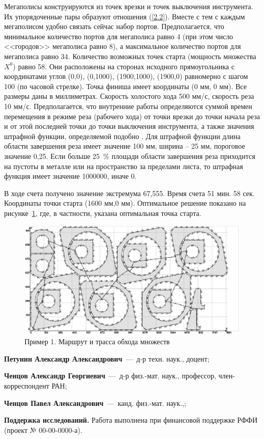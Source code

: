 \documentclass[10pt]{SPIIRAS_Proceedings}
\begin{document}
Мегаполисы конструируются из точек врезки и точек выключения инструмента.
Их упорядоченные пары образуют отношения (\ref{2.2}).
Вместе с тем с каждым мегаполисом удобно связать сейчас набор портов.
Предполагается, что минимальное количество портов для мегаполиса равно 4
(при этом число <<городов>> мегаполиса равно 8),
а максимальное количество портов для мегаполиса равно 34.
Количество возможных точек старта
(мощность множества $X^0$)
равно 58.
Они расположены на сторонах исходного прямоугольника с координатами углов
(0,0), (0,1000), (1900,1000), (1900,0)
равномерно с шагом 100
(по часовой стрелке).
Точка финиша имеет координаты (0 мм, 0 мм).
Все размеры даны в миллиметрах.
Скорость холостого хода 500 мм/с,
скорость реза 10 мм/с.
Предполагается, что внутренние работы определяются
суммой времен перемещения в режиме реза
(рабочего хода)
от точки врезки до точки начала реза
и от этой последней точки до
точки выключения инструмента,
а также значения штрафной функции, определяемой подобно
\cite{18}.
Для штрафной функции длина области завершения реза имеет значение 100 мм,
ширина -- 25 мм,
пороговое значение 0,25.
Если больше 25~\% площади области завершения
реза приходится на пустоты в металле или на пространство за пределами листа,
то штрафная функция имеет значение 1000000, иначе 0.

В ходе счета получено значение экстремума 67,555.
Время счета 51 мин. 58 сек.
Координаты точки старта
(1600 мм,0 мм).
Оптимальное решение показано на рисунке~\ref{fig:1},
где, в частности, указана оптимальная точка старта.


\begin{figure}[h!]
  \centering
  \includegraphics[width=\textwidth]{image.eps}
  \caption{Пример 1. Маршрут и трасса обхода множеств}
  \label{fig:1}
\end{figure}

\printbibliography[title=Литература]

\begin{aboutAuthors}

\textbf{Петунин Александр Александрович}~---~д-р техн. наук., доцент;
\smallskip

\textbf{Ченцов Александр Георгиевич}~---~д-р физ.-мат. наук., профессор, член-корреспондент РАН;
\smallskip

\textbf{Ченцов Павел Александрович}~---~канд. физ.-мат. наук.,;
\smallskip

\textbf{Поддержка исследований.}
Работа выполнена при финансовой поддержке РФФИ (проект № 00-00-0000-а).

\end{aboutAuthors}
\end{document}
